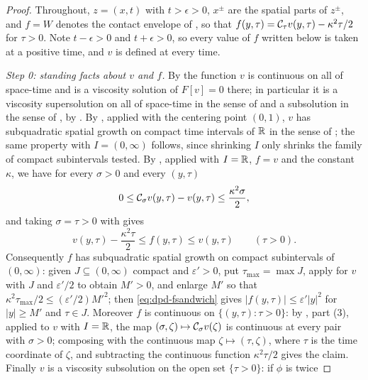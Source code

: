 \begin{proof}
Throughout, $z=(x,t)$ with $t>\epsilon>0$, $x^\pm$ are the spatial parts of
$z^\pm$, and $f=W$ denotes the contact envelope of , so
that $f(y,\tau)=\mathcal{C}_\tau v(y,\tau)-\kappa^2\tau/2$ for $\tau>0$. Note
$t-\epsilon>0$ and $t+\epsilon>0$, so every value of $f$ written below is taken
at a positive time, and $v$ is defined at every time.

\emph{Step 0: standing facts about $v$ and $f$.}
By  the function $v$ is continuous on all of space-time and
is a viscosity solution of $F[v]=0$ there; in particular it is a viscosity
supersolution on all of space-time in the sense of  and
a subsolution in the sense of , by
. By , applied with the
centering point $(0,1)$, $v$ has subquadratic spatial growth on compact time
intervals of $\mathbb{R}$ in the sense of ; the same
property with $I=(0,\infty)$ follows, since shrinking $I$ only shrinks the
family of compact subintervals tested. By , applied
with $I=\mathbb{R}$, $f=v$ and the constant $\kappa$, we have for every $\sigma>0$ and
every $(y,\tau)$
\begin{equation}\label{eq:dpd-sandwich}
  0\le\mathcal{C}_\sigma v(y,\tau)-v(y,\tau)\le\frac{\kappa^2\sigma}{2},
\end{equation}
and taking $\sigma=\tau>0$ with  gives
\begin{equation}\label{eq:dpd-fsandwich}
  v(y,\tau)-\frac{\kappa^2\tau}{2}\le f(y,\tau)\le v(y,\tau)\qquad(\tau>0).
\end{equation}
Consequently $f$ has subquadratic spatial growth on compact subintervals of
$(0,\infty)$: given $J\subseteq(0,\infty)$ compact and $\varepsilon'>0$, put
$\tau_{\max}=\max J$, apply  for $v$ with $J$ and
$\varepsilon'/2$ to obtain $M'>0$, and enlarge $M'$ so that
$\kappa^2\tau_{\max}/2\le(\varepsilon'/2)M'^2$; then
\eqref{eq:dpd-fsandwich} gives $|f(y,\tau)|\le\varepsilon'|y|^2$ for
$|y|\ge M'$ and $\tau\in J$. Moreover $f$ is continuous on
$\{(y,\tau):\tau>0\}$: by , part (3), applied to $v$
with $I=\mathbb{R}$, the map $(\sigma,\zeta)\mapsto\mathcal{C}_\sigma v(\zeta)$ is continuous
at every pair with $\sigma>0$; composing with the continuous map
$\zeta\mapsto(\tau,\zeta)$, where $\tau$ is the time coordinate of $\zeta$, and
subtracting the continuous function $\kappa^2\tau/2$ gives the claim. Finally
$v$ is a viscosity subsolution on the open set $\{\tau>0\}$: if $\phi$ is twice

\end{proof}
